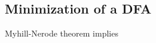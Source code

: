 

\setcounter{section}{4}
\setcounter{subsection}{3}
\setcounter{dfn}{7}

\subsection{Minimization of a DFA}
Myhill-Nerode theorem implies


